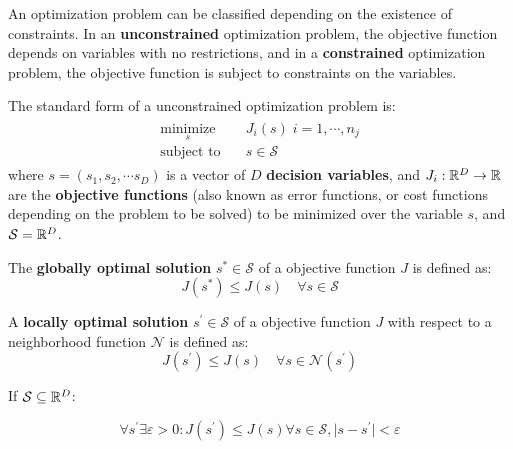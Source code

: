 An optimization problem can be classified depending on the existence of constraints. In an \textbf{unconstrained} optimization problem, the objective function depends on variables with no restrictions, and in a \textbf{constrained} optimization problem, the objective function is subject to constraints on the variables.

\begin{definition}
The standard form of a unconstrained optimization problem is:
%
\begin{align}
\begin{split}
    \underset{s}{\text{minimize}} \quad & J_i(s) \; i = 1, \cdots, n_j \\
    \text{subject to} \quad & s \in \mathcal{S}
\end{split}
\end{align}
%
where $s = \left( s_1, s_2, \cdots s_D \right)$ is a vector of $D$ \textbf{decision variables}, and $J_i: \mathbb{R}^D \to \mathbb{R}$ are the \textbf{objective functions} (also known as error functions, or cost functions depending on the problem to be solved) to be minimized over the variable $s$, and $\mathcal{S} = \mathbb{R}^D$.

\end{definition}

\begin{definition}
The \textbf{globally optimal solution} $s^* \in \mathcal{S}$ of a objective function $J$ is defined as:
%
\begin{equation}
    J(s^*) \leq J(s) \quad \forall s \in \mathcal{S}
\end{equation}
%

\end{definition}

\begin{definition}
A \textbf{locally optimal solution} $s^\prime \in \mathcal{S}$ of a objective function $J$ with respect to a neighborhood function $\mathcal{N}$ is defined as: 
%
\begin{equation}
    J(s^\prime) \leq J(s) \quad \forall s \in \mathcal{N}(s^\prime)
\end{equation}

If $\mathcal{S} \subseteq \mathbb{R}^D$:

\begin{equation}
    \forall s^\prime  \exists \varepsilon > 0 : J(s^\prime) \leq J(s) \forall s \in \mathcal{S}, \mid s - s^\prime \mid < \varepsilon
\end{equation}

\end{definition}

